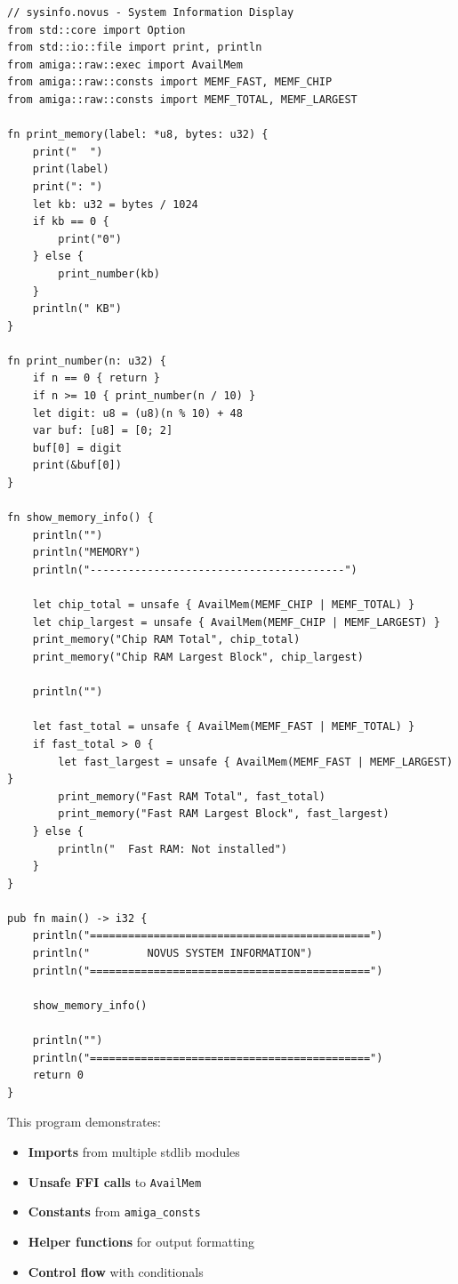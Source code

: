 \begin{lstlisting}
// sysinfo.novus - System Information Display
from std::core import Option
from std::io::file import print, println
from amiga::raw::exec import AvailMem
from amiga::raw::consts import MEMF_FAST, MEMF_CHIP
from amiga::raw::consts import MEMF_TOTAL, MEMF_LARGEST

fn print_memory(label: *u8, bytes: u32) {
    print("  ")
    print(label)
    print(": ")
    let kb: u32 = bytes / 1024
    if kb == 0 {
        print("0")
    } else {
        print_number(kb)
    }
    println(" KB")
}

fn print_number(n: u32) {
    if n == 0 { return }
    if n >= 10 { print_number(n / 10) }
    let digit: u8 = (u8)(n % 10) + 48
    var buf: [u8] = [0; 2]
    buf[0] = digit
    print(&buf[0])
}

fn show_memory_info() {
    println("")
    println("MEMORY")
    println("----------------------------------------")

    let chip_total = unsafe { AvailMem(MEMF_CHIP | MEMF_TOTAL) }
    let chip_largest = unsafe { AvailMem(MEMF_CHIP | MEMF_LARGEST) }
    print_memory("Chip RAM Total", chip_total)
    print_memory("Chip RAM Largest Block", chip_largest)

    println("")

    let fast_total = unsafe { AvailMem(MEMF_FAST | MEMF_TOTAL) }
    if fast_total > 0 {
        let fast_largest = unsafe { AvailMem(MEMF_FAST | MEMF_LARGEST) }
        print_memory("Fast RAM Total", fast_total)
        print_memory("Fast RAM Largest Block", fast_largest)
    } else {
        println("  Fast RAM: Not installed")
    }
}

pub fn main() -> i32 {
    println("============================================")
    println("         NOVUS SYSTEM INFORMATION")
    println("============================================")

    show_memory_info()

    println("")
    println("============================================")
    return 0
}
\end{lstlisting}

This program demonstrates:
\begin{itemize}
    \item \textbf{Imports} from multiple stdlib modules
    \item \textbf{Unsafe FFI calls} to \texttt{AvailMem}
    \item \textbf{Constants} from \texttt{amiga\_consts}
    \item \textbf{Helper functions} for output formatting
    \item \textbf{Control flow} with conditionals
\end{itemize}


